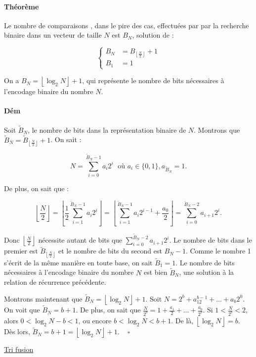 \documentclass{article}
\newcommand{\floor}[1]{{\left\lfloor#1\right\rfloor}}
\begin{document}
			\paragraph{Théorème} Le nombre de comparaisons , dans le pire des cas, effectuées par par la recherche binaire dans un vecteur de taille $N$ est $B_N$, solution de :

			\[\left\{\begin{aligned}B_N &= B_\floor{\frac N2} + 1\\B_1 &= 1\end{aligned}\right.\]

			On a $B_N = \floor{\log_2 N} + 1$, qui représente le nombre de bits nécessaires à l'encodage binaire du nombre $N$.

			\paragraph{Dém} Soit $\widetilde B_N$, le nombre de bits dans la représentation binaire de $N$. Montrons que $\widetilde B_N = \widetilde B_\floor{\frac N2} + 1$. On sait :

			\[N = \sum_{i=0}^{\widetilde B_N-1}a_i2^i \; \text{ où } a_i \in \{0, 1\}, a_{\widetilde B_N} = 1.\]

			De plus, on sait que :

			\[\floor{\frac N2} = \floor{\frac 12\sum_{i=1}^{\widetilde B_N-1}a_i2^i} = \floor{\sum_{i=1}^{\widetilde B_N-1}a_i2^{i-1} + \frac {a_0}2} = \sum_{i=0}^{\widetilde B_N-2}a_{i+1}2^i.\]

			Donc $\floor{\frac N2}$ nécessite autant de bits que $\sum_{i=0}^{\widetilde B_N-2}a_{i+1}2^i$. Le nombre de bits dans le premier est $\widetilde B_\floor {\frac N2}$
			et le nombre de bits du second est $B_N - 1$. Comme le nombre 1 s'écrit de la même manière en toute base, on sait $\widetilde B_1 = 1$.
			Le nombre de bits nécessaires à l'encodage binaire du nombre $N$ est bien $\widetilde B_N$, une solution à la relation de récurrence précédente.

			Montrons maintenant que $\widetilde B_N = \floor{\log_2 N} + 1$. Soit $N = 2^b + a_12^{b-1} + \ldots + a_b2^0$. On voit que $\widetilde B_N = b + 1$. De plus,
			on sait que $\frac N{2^b} = 1 + \frac {a_1}2 + \ldots + \frac {a_b}{2^b}$. Si $1 < \frac N{2^b} < 2$, alors $0 < \log_2 N - b < 1$, ou encore $b < \log_2 N < b+1$.
			De là, $\floor{\log_2 N} = b$. Dès lors, $\widetilde B_N = b + 1 = \floor{\log_2 N} + 1$. $\;\;\;\square$

			\underline{Tri fusion}
\end{document}
